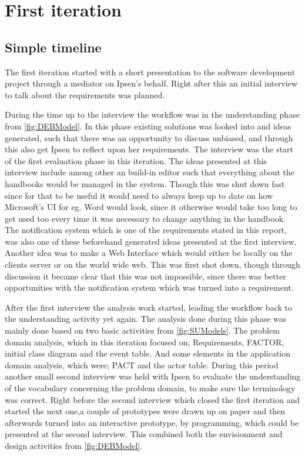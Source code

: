 \section{First iteration}\label{sec:Iteration1}
\subsection{Simple timeline}
The first iteration started with a short presentation to the software development project through a mediator on Ipsen's behalf.
Right after this an initial interview to talk about the requirements was planned.

During the time up to the interview the workflow was in the understanding phase from \cref{fig:DEBModel}.
In this phase existing solutions was looked into and ideas generated, such that there was an opportunity to discuss unbiased, and through this also get Ipsen to reflect upon her requirements.
The interview was the start of the first evaluation phase in this iteration.
The ideas presented at this interview include among other an build-in editor such that everything about the handbooks would be managed in the system.
Though this was shut down fast since for that to be useful it would need to always keep up to date on how Microsoft's UI for eg. Word would look, since it otherwise would take too long to get used too every time it was necessary to change anything in the handbook.
The notification system which is one of the requirements stated in this report, was also one of these beforehand generated ideas presented at the first interview. 
Another idea was to make a Web Interface which would either be locally on the clients server or on the world wide web. This was first shot down, though through discussion it became clear that this was not impossible, since there was better opportunities with the notification system which was turned into a requirement.

After the first interview the analysis work started, leading the workflow back to the understanding activity yet again.
The analysis done during this phase was mainly done based on two basic activities from \cref{fig:SUModels}.
The problem domain analysis, which in this iteration focused on; Requirements, FACTOR, initial class diagram and the event table.
And some elements in the application domain analysis, which were; PACT and the actor table.
During this period another small second interview was held with Ipsen to evaluate the understanding of the vocabulary concerning the problem domain, to make sure the terminology was correct.
Right before the second interview which closed the first iteration and started the next one,a couple of prototypes were drawn up on paper and then afterwards turned into an interactive prototype, by programming, which could be presented at the second interview.
This combined both the envisionment and design activities from \cref{fig:DEBModel}.

